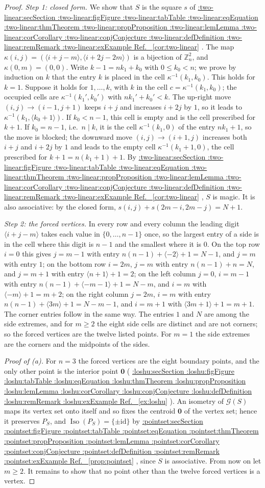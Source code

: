 \documentclass[11pt,a4paper]{article}
\makeatletter
\def\Cref@getprefix#1:#2\relax{#1}
\def\Cref@prefix@sec{sec}
\def\Cref@prefix@fig{fig}
\def\Cref@prefix@tab{tab}
\def\Cref@prefix@eq{eq}
\def\Cref@prefix@thm{thm}
\def\Cref@prefix@prop{prop}
\def\Cref@prefix@lem{lem}
\def\Cref@prefix@cor{cor}
\def\Cref@prefix@conj{conj}
\def\Cref@prefix@def{def}
\def\Cref@prefix@rem{rem}
\def\Cref@prefix@ex{ex}
\def\Cref@type@cap#1{%
  \edef\Cref@tmp{#1}%
  \ifx\Cref@tmp\Cref@prefix@sec Section%
  \else\ifx\Cref@tmp\Cref@prefix@fig Figure%
  \else\ifx\Cref@tmp\Cref@prefix@tab Table%
  \else\ifx\Cref@tmp\Cref@prefix@eq Equation%
  \else\ifx\Cref@tmp\Cref@prefix@thm Theorem%
  \else\ifx\Cref@tmp\Cref@prefix@prop Proposition%
  \else\ifx\Cref@tmp\Cref@prefix@lem Lemma%
  \else\ifx\Cref@tmp\Cref@prefix@cor Corollary%
  \else\ifx\Cref@tmp\Cref@prefix@conj Conjecture%
  \else\ifx\Cref@tmp\Cref@prefix@def Definition%
  \else\ifx\Cref@tmp\Cref@prefix@rem Remark%
  \else\ifx\Cref@tmp\Cref@prefix@ex Example%
  \else Ref.%
  \fi\fi\fi\fi\fi\fi\fi\fi\fi\fi\fi\fi
}
\DeclareRobustCommand{\Cref}[1]{%
  \begingroup
  \edef\Cref@label{#1}%
  \edef\Cref@prefix{\expandafter\Cref@getprefix\Cref@label:\relax}%
  \hyperref[#1]{\Cref@type@cap{\Cref@prefix}~\ref*{#1}}%
  \endgroup
}
\theoremstyle{plain}
\theoremstyle{definition}
\theoremstyle{remark}
\newcommand{\Z}{\mathbb{Z}}
\makeatother
\begin{document}
\begin{proof}
\emph{Step 1: closed form.}
We show that $S$ is the square $s$ of \Cref{cor:two-linear}.
The map $\kappa(i,j)=(\langle i+j-m\rangle,\langle i+2j-2m\rangle)$ is a bijection of $\Z_n^2$, and $\kappa(0,m)=(0,0)$.
Write $k-1=nk_1+k_0$ with $0\le k_0<n$; we prove by induction on $k$ that the entry $k$ is placed in the cell $\kappa^{-1}(k_1,k_0)$.
This holds for $k=1$. Suppose it holds for $1,\dots,k$, with $k$ in the cell $c=\kappa^{-1}(k_1,k_0)$; the occupied cells are $\kappa^{-1}(k_1',k_0')$ with $nk_1'+k_0'<k$.
The up-right move $(i,j)\to(i-1,j+1)$ keeps $i+j$ and increases $i+2j$ by $1$, so it leads to $\kappa^{-1}(k_1,\langle k_0+1\rangle)$.
If $k_0<n-1$, this cell is empty and is the cell prescribed for $k+1$.
If $k_0=n-1$, i.e.\ $n\mid k$, it is the cell $\kappa^{-1}(k_1,0)$ of the entry $nk_1+1$, so the move is blocked; the downward move $(i,j)\to(i+1,j)$ increases both $i+j$ and $i+2j$ by $1$ and leads to the empty cell $\kappa^{-1}(k_1+1,0)$, the cell prescribed for $k+1=n(k_1+1)+1$.
By \Cref{cor:two-linear}, $S$ is magic. It is also associative: by the closed form, $s(i,j)+s(2m-i,2m-j)=N+1$.

\emph{Step 2: the forced vertices.}
In every row and every column the leading digit $\langle i+j-m\rangle$ takes each value in $\{0,\dots,n-1\}$ once, so the largest entry of a side is in the cell where this digit is $n-1$ and the smallest where it is $0$.
On the top row $i=0$ this gives $j=m-1$ with entry $n(n-1)+\langle-2\rangle+1=N-1$, and $j=m$ with entry $1$; on the bottom row $i=2m$, $j=m$ with entry $n(n-1)+n=N$, and $j=m+1$ with entry $\langle n+1\rangle+1=2$; on the left column $j=0$, $i=m-1$ with entry $n(n-1)+\langle-m-1\rangle+1=N-m$, and $i=m$ with $\langle-m\rangle+1=m+2$; on the right column $j=2m$, $i=m$ with entry $n(n-1)+\langle3m\rangle+1=N-m-1$, and $i=m+1$ with $\langle3m+1\rangle+1=m+1$.
The corner entries follow in the same way.
The entries $1$ and $N$ are among the side extremes, and for $m\ge2$ the eight side cells are distinct and are not corners; so the forced vertices are the twelve listed points. For $m=1$ the side extremes are the corners and the midpoints of the sides.

\emph{Proof of (a).} For $n=3$ the forced vertices are the eight boundary points, and the only other point is the interior point $\mathbf 0$ (\Cref{ex:loshu}). An isometry of $\mathcal G(S)$ maps its vertex set onto itself and so fixes the centroid $\mathbf 0$ of the vertex set; hence it preserves $P_S$, and $\operatorname{Iso}(P_S)=\{\pm\mathrm{id}\}$ by \Cref{prop:pointset}, since $S$ is associative.
From now on let $m\ge2$. It remains to show that no point other than the twelve forced vertices is a vertex.


\end{proof}
\end{document}
